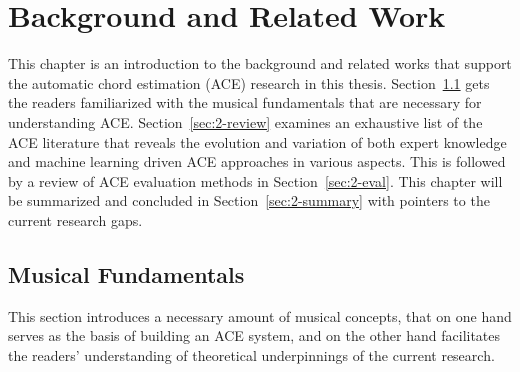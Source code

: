 


\chapter{Background and Related Work}\label{cp:background} %

\ifpdf
    \graphicspath{{X/figures/PNG/}{X/figures/PDF/}{X/figures/}}
\else
    \graphicspath{{X/figures/EPS/}{X/figures/}}
\fi

This chapter is an introduction to the background and related works that support the automatic chord estimation (ACE) research in this thesis. Section~\ref{sec:2-fund} gets the readers familiarized with the musical fundamentals that are necessary for understanding ACE. Section~\ref{sec:2-review} examines an exhaustive list of the ACE literature that reveals the evolution and variation of both expert knowledge and machine learning driven ACE approaches in various aspects. This is followed by a review of ACE evaluation methods in Section~\ref{sec:2-eval}. This chapter will be summarized and concluded in Section~\ref{sec:2-summary} with pointers to the current research gaps.




\section{Musical Fundamentals} \label{sec:2-fund}
This section introduces a necessary amount of musical concepts, that on one hand serves as the basis of building an ACE system, and on the other hand facilitates the readers' understanding of theoretical underpinnings of the current research.


